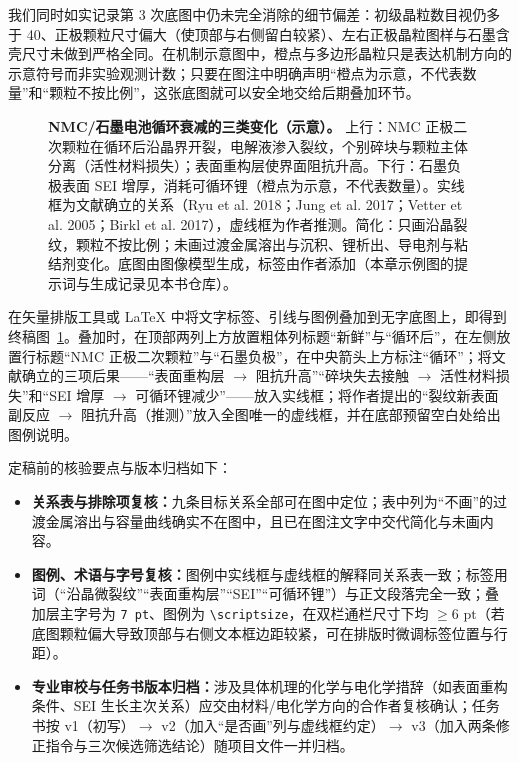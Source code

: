 我们同时如实记录第 3 次底图中仍未完全消除的细节偏差：初级晶粒数目视仍多于 40、正极颗粒尺寸偏大（使顶部与右侧留白较紧）、左右正极晶粒图样与石墨含壳尺寸未做到严格全同。在机制示意图中，橙点与多边形晶粒只是表达机制方向的示意符号而非实验观测计数；只要在图注中明确声明“橙点为示意，不代表数量”和“颗粒不按比例”，这张底图就可以安全地交给后期叠加环节。

\begin{figure}[htbp]\centering
\makebox[\linewidth][c]{}
\caption{\textbf{NMC/石墨电池循环衰减的三类变化（示意）。} 上行：NMC 正极二次颗粒在循环后沿晶界开裂，电解液渗入裂纹，个别碎块与颗粒主体分离（活性材料损失）；表面重构层使界面阻抗升高。下行：石墨负极表面 SEI 增厚，消耗可循环锂（橙点为示意，不代表数量）。实线框为文献确立的关系（Ryu et al. 2018；Jung et al. 2017；Vetter et al. 2005；Birkl et al. 2017），虚线框为作者推测。简化：只画沿晶裂纹，颗粒不按比例；未画过渡金属溶出与沉积、锂析出、导电剂与粘结剂变化。底图由图像模型生成，标签由作者添加（本章示例图的提示词与生成记录见本书仓库）。}\label{fig:ch02-06}
\end{figure}

在矢量排版工具或 LaTeX 中将文字标签、引线与图例叠加到无字底图上，即得到终稿图~\ref{fig:ch02-06}。叠加时，在顶部两列上方放置粗体列标题“新鲜”与“循环后”，在左侧放置行标题“NMC 正极二次颗粒”与“石墨负极”，在中央箭头上方标注“循环”；将文献确立的三项后果——“表面重构层 \ensuremath{\rightarrow} 阻抗升高”“碎块失去接触 \ensuremath{\rightarrow} 活性材料损失”和“SEI 增厚 \ensuremath{\rightarrow} 可循环锂减少”——放入实线框；将作者提出的“裂纹新表面副反应 \ensuremath{\rightarrow} 阻抗升高（推测）”放入全图唯一的虚线框，并在底部预留空白处给出图例说明。

定稿前的核验要点与版本归档如下：
\begin{itemize}
\item \textbf{关系表与排除项复核：}九条目标关系全部可在图中定位；表中列为“不画”的过渡金属溶出与容量曲线确实不在图中，且已在图注文字中交代简化与未画内容。
\item \textbf{图例、术语与字号复核：}图例中实线框与虚线框的解释同关系表一致；标签用词（“沿晶微裂纹”“表面重构层”“SEI”“可循环锂”）与正文段落完全一致；叠加层主字号为 \texttt{7 pt}、图例为 \texttt{\textbackslash scriptsize}，在双栏通栏尺寸下均 $\ge 6\text{ pt}$（若底图颗粒偏大导致顶部与右侧文本框边距较紧，可在排版时微调标签位置与行距）。
\item \textbf{专业审校与任务书版本归档：}涉及具体机理的化学与电化学措辞（如表面重构条件、SEI 生长主次关系）应交由材料/电化学方向的合作者复核确认；任务书按 v1（初写）\ensuremath{\rightarrow} v2（加入“是否画”列与虚线框约定）\ensuremath{\rightarrow} v3（加入两条修正指令与三次候选筛选结论）随项目文件一并归档。
\end{itemize}

